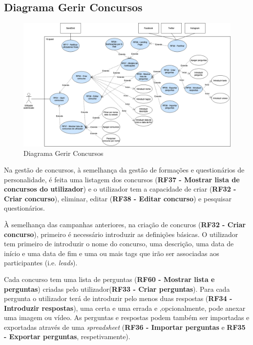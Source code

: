 \subsection{Diagrama Gerir Concursos}
\label{d:concursos}
\begin{figure}[ht!]
	\begin{center}
		\includegraphics[width=1\textwidth]{img/rf/gerir-concurso}
		\caption{Diagrama Gerir Concursos}
		\label{fig:rf-gerir-concursos}
	\end{center}
\end{figure}


Na gestão de concursos, à semelhança da gestão de formações e questionários de personalidade, é feita uma listagem dos concursos (\textbf{RF37 - Mostrar lista de concursos do utilizador}) e o utilizador tem a capacidade de criar (\textbf{RF32 - Criar concurso}), eliminar, editar (\textbf{RF38 - Editar concurso}) e pesquisar questionários.

À semelhança das campanhas anteriores, na criação de concuros (\textbf{RF32 - Criar concurso}), primeiro é necessário introduzir as definições básicas. O utilizador tem primeiro de introduzir o nome do concurso, uma descrição, uma data de início e uma data de fim e uma ou mais tags que irão ser associadas aos participantes (i.e. \textit{leads}).

Cada concurso tem uma lista de perguntas (\textbf{RF60 - Mostrar lista e perguntas}) criadas pelo utilizador(\textbf{RF33 - Criar perguntas}). Para cada pergunta o utilizador terá de introduzir pelo menos duas respostas (\textbf{RF34 - Introduzir respostas}), uma certa e uma errada e ,opcionalmente, pode anexar uma imagem ou vídeo. As perguntas e respostas podem também ser importadas e exportadas através de uma  \textit{spreadsheet} (\textbf{RF36 - Importar perguntas} e \textbf{RF35 - Exportar perguntas}, respetivamente).

